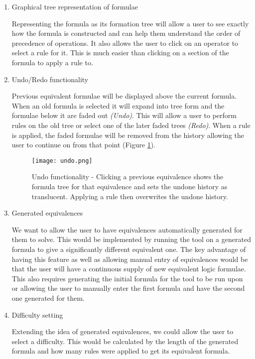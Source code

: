 \documentclass{report}
\begin{document}
\begin{enumerate}
\item Graphical tree representation of formulae

Representing the formula as its formation tree will allow a user to see exactly how the formula is constructed and can help them understand the order of precedence of operations. It also allows the user to click on an operator to select a rule for it. This is much easier than clicking on a section of the formula to apply a rule to.

\item Undo/Redo functionality

Previous equivalent formulae will be displayed above the current formula. When an old formula is selected it will expand into tree form and the formulae below it are faded out \textit{(Undo)}. This will allow a user to perform rules on the old tree or select one of the later faded trees \textit{(Redo)}. When a rule is applied, the faded formulae will be removed from the history allowing the user to continue on from that point (Figure \ref{undo}).

\begin{figure}[ht]
    \centering
    \texttt{[image: undo.png]}
    \caption{Undo functionality - Clicking a previous equivalence shows the formula tree for that equivalence and sets the undone history as translucent. Applying a rule then overwrites the undone history.}
    \label{undo}
\end{figure}

\item Generated equivalences

We want to allow the user to have equivalences automatically generated for them to solve. This would be implemented by running the tool on a generated formula to give a significantly different equivalent one. The key advantage of having this feature as well as allowing manual entry of equivalences would be that the user will have a continuous supply of new equivalent logic formulae. This also requires generating the initial formula for the tool to be run upon or allowing the user to manually enter the first formula and have the second one generated for them.

\item Difficulty setting

Extending the idea of generated equivalences, we could allow the user to select a difficulty. This would be calculated by the length of the generated formula and how many rules were applied to get its equivalent formula.


\end{enumerate}
\end{document}
